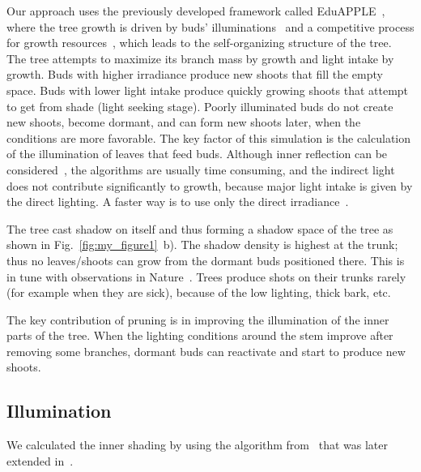 Our approach uses the previously developed framework called EduAPPLE~\cite{kohek_eduapple:_2015},
where the tree growth is driven by buds' illuminations~\cite{benes_efficient_1996,benes_visual_1997,mech_visual_1996} and a competitive process for growth resources~\cite{alsweis_modeling_2005,arvo_modeling_1988,palubicki_self-organizing_2009,runions_modeling_2007}, which leads to the self-organizing structure of the tree. 
The tree attempts to maximize its branch mass by growth and light intake by
growth. Buds with higher irradiance produce new shoots that fill the
empty space. Buds with lower light intake produce quickly growing shoots
that attempt to get from shade (light seeking stage). Poorly illuminated buds do not create new shoots, become dormant, and can form new shoots later, when the conditions are more favorable. The key factor of this simulation is the calculation of the illumination of leaves that feed buds. Although inner reflection can be considered~\cite{soler_efficient_2003},
the algorithms are usually time consuming, and the indirect light does
not contribute significantly to growth, because major light intake is
given by the direct lighting. A faster way is to use only the direct
irradiance~\cite{benes_efficient_1996,benes_visual_1997,mech_visual_1996,pirk_plastic_2012}. 

The tree cast shadow on itself and thus
forming a shadow space of the tree as shown in Fig.~\ref{fig:my_figure1}~b). The shadow
density is highest at the trunk; thus no leaves/shoots can grow from the
dormant buds positioned there. This is in tune with observations in Nature~\cite{wohlleben2016hidden}. Trees produce shots on their trunks rarely (for example when they are sick), because of the low lighting, thick bark, etc.  

The key contribution of pruning is in
improving the illumination of the inner parts of the tree. When the
lighting conditions around the stem improve after removing some
branches, dormant buds can reactivate and start to produce new shoots.


\subsection{Illumination}
We calculated the inner shading by using the algorithm from~\cite{palubicki_self-organizing_2009}
that was later extended in~\cite{pirk_plastic_2012,stava_inverse_2014,strnad_novel_2017}. 

